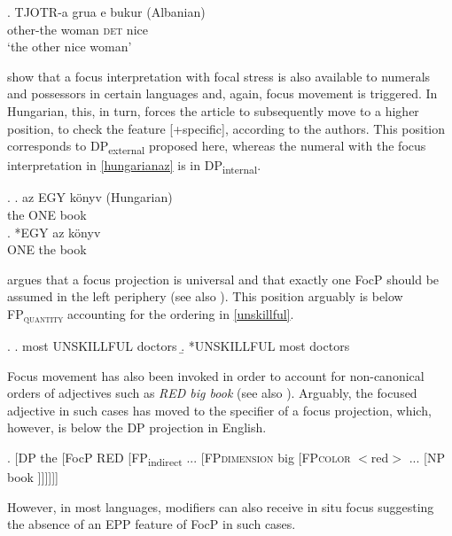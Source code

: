 \exg. TJOTR-a grua e bukur (Albanian)\\
other-the woman \textsc{det} nice\\
`the other nice woman' \\ \null \hfill \citep[113]{giusti:1996:is} \label{albanian}

\citet{ihsane:2001:specific} show that a focus interpretation with focal stress is also available to numerals and possessors in certain languages and, again, focus movement is triggered. In Hungarian, this, in turn, forces the article to subsequently move to a higher position, to check the feature [+specific], according to the authors. This position corresponds to DP\textsubscript{external} proposed here, whereas the numeral with the focus interpretation in \ref{hungarianaz} is in   DP\textsubscript{internal}.

\ex. \label{hungarianaz} \ag. az EGY könyv (Hungarian)\\
the ONE book \\
\bg. *EGY az könyv\\
ONE the book \\ \null \hfill \citep[48]{ihsane:2001:specific}

\citet[§ 6.7]{kim:2019:syntax} argues that a focus projection is universal and that exactly one FocP should be assumed in the left periphery (see also \citealt{giusti:2016:latin, roehrs:2019:left}). This position arguably is below FP\textsubscript{\textsc{quantity}} accounting for the ordering in \ref{unskillful}. 

\newpage

\ex. \label{unskillful} \a. most UNSKILLFUL doctors \null \hfill \citep[137]{kim:2019:syntax}
\b. *UNSKILLFUL most doctors

Focus movement has also been invoked in order to account for non-canonical orders of adjectives such as \textit{RED big book} (see also \citealt{svenonius:2008:position}). Arguably, the focused adjective in such cases has moved to the specifier of a focus projection, which, however, is below the DP projection in English.

\exi. [DP the [FocP RED [FP\textsubscript{indirect} ... [FP\textsc{dimension} big [FP\textsc{color} $<$red$>$ ... [NP book ]]]]]] %

However, in most languages, modifiers can also receive in situ focus \citep[191]{kim:2019:syntax} suggesting the absence of an EPP feature of FocP in such cases.

